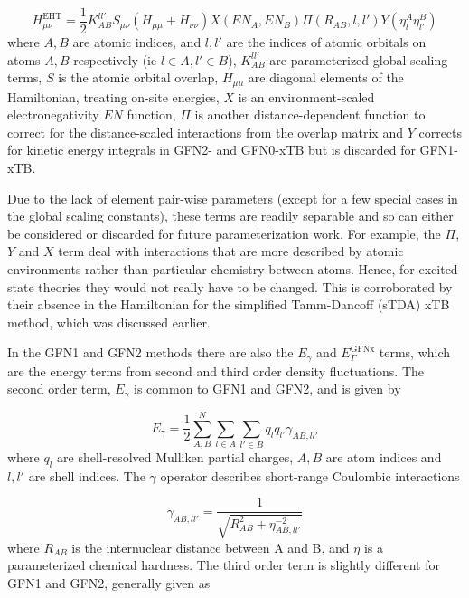 \begin{equation}
H_{\mu\nu}^{\text{EHT}} = \frac{1}{2} K_{AB}^{ll'}S_{\mu\nu}\left(H_{\mu\mu} + H_{\nu\nu}\right)X\left(EN_A, EN_B\right)\Pi\left(R_{AB}, l, l'\right)Y\left(\eta^A_l\eta^B_{l'}\right)
\end{equation}
%
where $A,B$ are atomic indices, and $l,l'$ are the indices of atomic orbitals on 
atoms $A, B$ respectively (ie $l \in A, l' \in B$), $K_{AB}^{ll'}$ are parameterized global 
scaling terms, $S$ is the atomic orbital overlap, $H_{\mu\mu}$ are diagonal elements
of the Hamiltonian, treating on-site energies, $X$ is an environment-scaled electronegativity
$EN$ function, $\Pi$ is another distance-dependent function to correct for the distance-scaled
interactions from the overlap matrix and $Y$ corrects for kinetic energy integrals
in GFN2- and GFN0-xTB but is discarded for GFN1-xTB.

Due to the lack of element pair-wise parameters (except for a few special cases 
in the global scaling constants), these terms are readily separable and so can either 
be considered or discarded for future parameterization work. For example, the $\Pi$,
$Y$ and $X$ term deal with interactions that are more described by atomic environments 
rather than particular chemistry between atoms. Hence, for excited state theories they 
would not really have to be changed. This is corroborated by their absence in the 
Hamiltonian for the simplified Tamm-Dancoff (sTDA) xTB \cite{Grimme2016} method, 
which was discussed earlier.

In the GFN1 and GFN2 methods there are also the $E_\gamma$ and $E_\Gamma^{\text{GFNx}}$ 
terms, which are the energy terms from second and third order density fluctuations. 
The second order term, $E_\gamma$ is common to GFN1 and GFN2, and is given by

\begin{equation}
E_\gamma = \frac{1}{2} \sum^{N}_{A,B} \sum_{l \in A} \sum_{l' \in B} q_l q_{l'} \gamma_{AB, ll'}
\end{equation}
%
where $q_l$ are shell-resolved Mulliken partial charges, $A,B$ are atom indices 
and $l,l'$ are shell indices. The $\gamma$ operator describes short-range Coulombic 
interactions

\begin{equation}
\gamma_{AB, ll'} = \frac{1}{\sqrt{R^2_{AB} + \eta^{-2}_{AB, ll'}}}
\end{equation}
%
where $R_{AB}$ is the internuclear distance between A and B, and $\eta$ is a parameterized 
chemical hardness. The third order term is slightly different for GFN1 and GFN2,
generally given as

